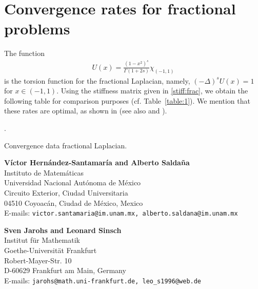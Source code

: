 \documentclass[10 pt]{article}
\numberwithin{equation}{section}
\begin{document}
\section{Convergence rates for fractional problems}
 
The function
\begin{align*}
 U(x)=\frac{(1-x^2)^s}{\Gamma(1+2s)}\chi_{(-1,1)}
\end{align*}
is the torsion function for the fractional Laplacian, namely, $(-\Delta)^s U(x)=1$ for $x\in (-1,1)$.  Using the stiffness matrix given in \eqref{stiff:frac}, we obtain the following table for comparison purposes (cf. Table~\ref{table:1}).  We mention that these rates are optimal, as shown in \cite{Bor17} (see also \cite[Section 5]{AB17} and \cite[Section 5]{BHS19}).
 
 
{\color{white}.}
\begin{table}[htb]
\centering
%
\data
%
%
\pgfplotstabletypeset[clear infinite, empty cells with={\ensuremath{-}},
every head row/.style={
before row=\toprule,after row=\midrule},
every last row/.style={
after row=\bottomrule},
]{\data}
%
\caption{Convergence data fractional Laplacian.}
\label{table:frac_lap}
\end{table}
 
 
 
 


\bigskip
\begin{flushleft}
\textbf{Víctor Hernández-Santamaría and Alberto Saldaña}\\
Instituto de Matemáticas\\
Universidad Nacional Autónoma de México\\
Circuito Exterior, Ciudad Universitaria\\
04510 Coyoacán, Ciudad de México, Mexico\\
E-mails: \texttt{victor.santamaria@im.unam.mx, alberto.saldana@im.unam.mx} 
\vspace{.3cm}
\end{flushleft}
\begin{flushleft}
\textbf{Sven Jarohs and Leonard Sinsch}\\
Institut f\"ur Mathematik\\
Goethe-Universit\"at Frankfurt\\
Robert-Mayer-Str. 10\\
D-60629 Frankfurt am Main, Germany  \\
E-mails: \texttt{jarohs@math.uni-frankfurt.de, leo\_s1996@web.de} 
\vspace{.3cm}
\end{flushleft}
\end{document}
